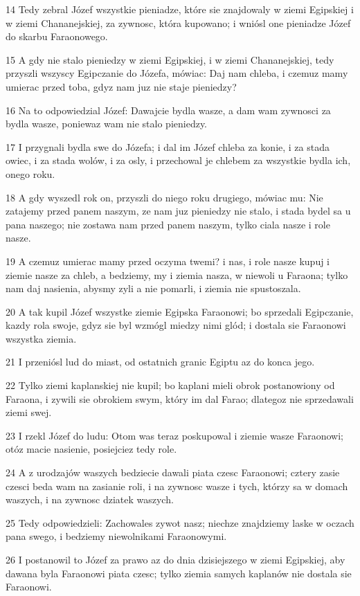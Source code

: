 \par 14 Tedy zebral Józef wszystkie pieniadze, które sie znajdowaly w ziemi Egipskiej i w ziemi Chananejskiej, za zywnosc, która kupowano; i wniósl one pieniadze Józef do skarbu Faraonowego.
\par 15 A gdy nie stalo pieniedzy w ziemi Egipskiej, i w ziemi Chananejskiej, tedy przyszli wszyscy Egipczanie do Józefa, mówiac: Daj nam chleba, i czemuz mamy umierac przed toba, gdyz nam juz nie staje pieniedzy?
\par 16 Na to odpowiedzial Józef: Dawajcie bydla wasze, a dam wam zywnosci za bydla wasze, poniewaz wam nie stalo pieniedzy.
\par 17 I przygnali bydla swe do Józefa; i dal im Józef chleba za konie, i za stada owiec, i za stada wolów, i za osly, i przechowal je chlebem za wszystkie bydla ich, onego roku.
\par 18 A gdy wyszedl rok on, przyszli do niego roku drugiego, mówiac mu: Nie zatajemy przed panem naszym, ze nam juz pieniedzy nie stalo, i stada bydel sa u pana naszego; nie zostawa nam przed panem naszym, tylko ciala nasze i role nasze.
\par 19 A czemuz umierac mamy przed oczyma twemi? i nas, i role nasze kupuj i ziemie nasze za chleb, a bedziemy, my i ziemia nasza, w niewoli u Faraona; tylko nam daj nasienia, abysmy zyli a nie pomarli, i ziemia nie spustoszala.
\par 20 A tak kupil Józef wszystke ziemie Egipska Faraonowi; bo sprzedali Egipczanie, kazdy rola swoje, gdyz sie byl wzmógl miedzy nimi glód; i dostala sie Faraonowi wszystka ziemia.
\par 21 I przeniósl lud do miast, od ostatnich granic Egiptu az do konca jego.
\par 22 Tylko ziemi kaplanskiej nie kupil; bo kaplani mieli obrok postanowiony od Faraona, i zywili sie obrokiem swym, który im dal Farao; dlategoz nie sprzedawali ziemi swej.
\par 23 I rzekl Józef do ludu: Otom was teraz poskupowal i ziemie wasze Faraonowi; otóz macie nasienie, posiejciez tedy role.
\par 24 A z urodzajów waszych bedziecie dawali piata czesc Faraonowi; cztery zasie czesci beda wam na zasianie roli, i na zywnosc wasze i tych, którzy sa w domach waszych, i na zywnosc dziatek waszych.
\par 25 Tedy odpowiedzieli: Zachowales zywot nasz; niechze znajdziemy laske w oczach pana swego, i bedziemy niewolnikami Faraonowymi.
\par 26 I postanowil to Józef za prawo az do dnia dzisiejszego w ziemi Egipskiej, aby dawana byla Faraonowi piata czesc; tylko ziemia samych kaplanów nie dostala sie Faraonowi.
